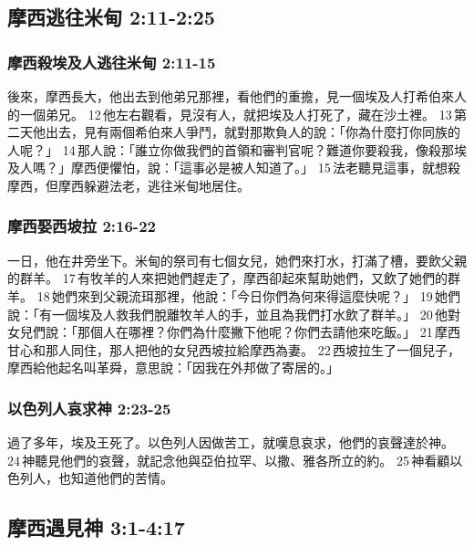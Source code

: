\subsection{摩西逃往米甸 2:11-2:25}
\subsubsection{摩西殺埃及人逃往米甸 2:11-15}
後來，摩西長大，他出去到他弟兄那裡，看他們的重擔，見一個埃及人打希伯來人的一個弟兄。 12 他左右觀看，見沒有人，就把埃及人打死了，藏在沙土裡。 13 第二天他出去，見有兩個希伯來人爭鬥，就對那欺負人的說：「你為什麼打你同族的人呢？」 14 那人說：「誰立你做我們的首領和審判官呢？難道你要殺我，像殺那埃及人嗎？」摩西便懼怕，說：「這事必是被人知道了。」 15 法老聽見這事，就想殺摩西，但摩西躲避法老，逃往米甸地居住。

\subsubsection{摩西娶西坡拉 2:16-22}
\noindent
一日，他在井旁坐下。米甸的祭司有七個女兒，她們來打水，打滿了槽，要飲父親的群羊。 17 有牧羊的人來把她們趕走了，摩西卻起來幫助她們，又飲了她們的群羊。 18 她們來到父親流珥那裡，他說：「今日你們為何來得這麼快呢？」 19 她們說：「有一個埃及人救我們脫離牧羊人的手，並且為我們打水飲了群羊。」 20 他對女兒們說：「那個人在哪裡？你們為什麼撇下他呢？你們去請他來吃飯。」 21 摩西甘心和那人同住，那人把他的女兒西坡拉給摩西為妻。 22 西坡拉生了一個兒子，摩西給他起名叫革舜，意思說：「因我在外邦做了寄居的。」

\subsubsection{以色列人哀求神 2:23-25 }
過了多年，埃及王死了。以色列人因做苦工，就嘆息哀求，他們的哀聲達於神。 24 神聽見他們的哀聲，就記念他與亞伯拉罕、以撒、雅各所立的約。 25 神看顧以色列人，也知道他們的苦情。

\subsection{摩西遇見神 3:1-4:17 }
